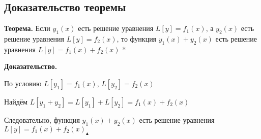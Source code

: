 \documentclass[11pt]{article}
\begin{document}
\subsection*{Доказательство теоремы}
\par\textbf{Теорема.} Если $y_{1}(x)$ есть решение уравнения $L[y] = f_{1}(x)$, а $y_{2}(x)$ есть решение уравнения $L[y] = f_{2}(x)$, то функция $y_{1}(x) + y_{2}(x)$ есть решение уравнения $L[y] = f_{1}(x) + f_{2}(x)$
*\par\textbf{Доказательство.}
\par По условию $L[y_1] = f_{1}(x)$, $L[y_2] = f_{2}(x)$
\par Найдём $L[y_{1} + y_{2}] = L[y_{1}] + L[y_{2}] = f_{1}(x) + f_{2}(x)$
\par Следовательно, функция $y_{1}(x) + y_{2}(x)$ есть решение уравнения $L[y] = f_{1}(x) + f_{2}(x) _{\blacktriangle}$
\end{document}
